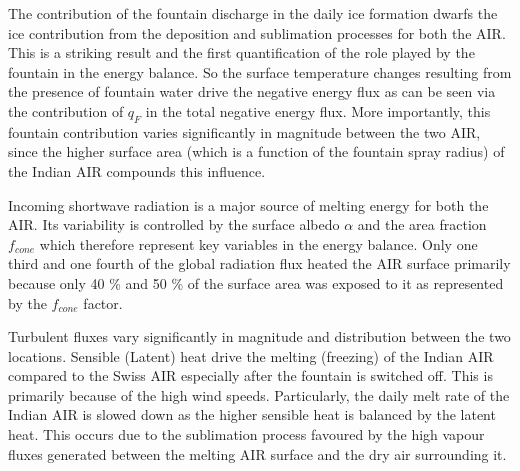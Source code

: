 \documentclass[utf8]{frontiersSCNS} %
\begin{document}
The contribution of the fountain discharge in the daily ice formation dwarfs the ice contribution from the deposition
and sublimation processes for both the AIR. This is a striking result and the first quantification of the role played by
the fountain in the energy balance. So the surface temperature changes resulting from the presence of fountain water
drive the negative energy flux as can be seen via the contribution of $q_F$ in the total negative energy flux. More
importantly, this fountain contribution varies significantly in magnitude between the two AIR, since the higher surface
area (which is a function of the fountain spray radius) of the Indian AIR compounds this influence.

Incoming shortwave radiation is a major source of melting energy for both the AIR. Its variability is controlled by the
surface albedo $\alpha$ and the area fraction $f_{cone}$ which therefore represent key variables in the energy balance.
Only one third and one fourth of the global radiation flux heated the AIR surface primarily because only 40 \% and 50 \%
of the surface area was exposed to it as represented by the $f_{cone}$ factor.  

Turbulent fluxes vary significantly in magnitude and distribution between the two locations. Sensible (Latent) heat
drive the melting (freezing) of the Indian AIR compared to the Swiss AIR especially after the fountain is switched off.
This is primarily because of the high wind speeds. Particularly, the daily melt rate of the Indian AIR is slowed down as
the higher sensible heat is balanced by the latent heat. This occurs due to the sublimation process favoured by the high
vapour fluxes generated between the melting AIR surface and the dry air surrounding it. 

\end{document}
